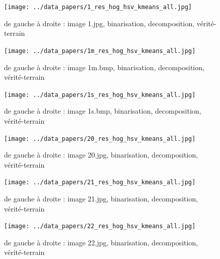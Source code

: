 \documentclass{book}
\begin{document}
\begin{figure}[H]
\begin{center}
\texttt{[image: ../data\_papers/1\_res\_hog\_hsv\_kmeans\_all.jpg]}
\end{center}
\caption{de gauche à droite : image 1.jpg, binarisation, decomposition, vérité-terrain}
\label{1}
\end{figure}
\clearpage


\begin{figure}[H]
\begin{center}
\texttt{[image: ../data\_papers/1m\_res\_hog\_hsv\_kmeans\_all.jpg]}
\end{center}
\caption{de gauche à droite : image 1m.bmp, binarisation, decomposition, vérité-terrain}
\label{1m}
\end{figure}
\clearpage


\begin{figure}[H]
\begin{center}
\texttt{[image: ../data\_papers/1s\_res\_hog\_hsv\_kmeans\_all.jpg]}
\end{center}
\caption{de gauche à droite : image 1s.bmp, binarisation, decomposition, vérité-terrain}
\label{1s}
\end{figure}
\clearpage


\begin{figure}[H]
\begin{center}
\texttt{[image: ../data\_papers/20\_res\_hog\_hsv\_kmeans\_all.jpg]}
\end{center}
\caption{de gauche à droite : image 20.jpg, binarisation, decomposition, vérité-terrain}
\label{20}
\end{figure}
\clearpage


\begin{figure}[H]
\begin{center}
\texttt{[image: ../data\_papers/21\_res\_hog\_hsv\_kmeans\_all.jpg]}
\end{center}
\caption{de gauche à droite : image 21.jpg, binarisation, decomposition, vérité-terrain}
\label{21}
\end{figure}
\clearpage


\begin{figure}[H]
\begin{center}
\texttt{[image: ../data\_papers/22\_res\_hog\_hsv\_kmeans\_all.jpg]}
\end{center}
\caption{de gauche à droite : image 22.jpg, binarisation, decomposition, vérité-terrain}
\label{22}
\end{figure}
\clearpage
\end{document}
